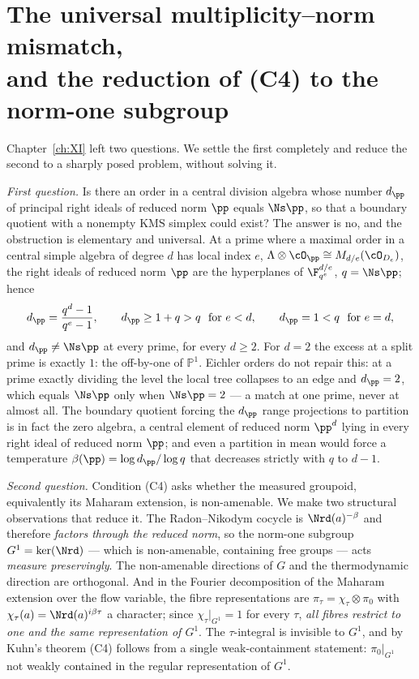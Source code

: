 \chapter[Multiplicity--norm mismatch and the reduction of (C4)]{The universal multiplicity--norm mismatch,\\ and the reduction of \textup{(C4)} to the norm-one subgroup}\label{ch:XII}
\begin{summary}
Chapter~\ref{ch:XI} left two questions. We settle the first completely and reduce the
second to a sharply posed problem, without solving it.

\emph{First question.} Is there an order in a central division algebra whose number
$d_\pp$ of principal right ideals of reduced norm $\pp$ equals $\Ns\pp$, so that a boundary
quotient with a nonempty $\mathrm{KMS}$ simplex could exist? The answer is no, and the
obstruction is elementary and universal. At a prime where a maximal order in a central
simple algebra of degree $d$ has local index $e$, $\Lambda\otimes\cO_\pp\cong M_{d/e}(\cO_{D_e})$,
the right ideals of reduced norm $\pp$ are the hyperplanes of $\F_{q^e}^{d/e}$, $q=\Ns\pp$;
hence
\[
d_\pp=\frac{q^d-1}{q^e-1},\qquad d_\pp\ge1+q>q\ \text{ for }e<d,\qquad d_\pp=1<q\ \text{ for }e=d,
\]
and $d_\pp\ne\Ns\pp$ at every prime, for every $d\ge2$. For $d=2$ the excess at a split prime
is exactly $1$: the off-by-one of $\mathbb P^1$. Eichler orders do not repair this: at a
prime exactly dividing the level the local tree collapses to an edge and $d_\pp=2$, which
equals $\Ns\pp$ only when $\Ns\pp=2$ --- a match at one prime, never at almost all. The
boundary quotient forcing the $d_\pp$ range projections to partition is in fact the zero
algebra, a central element of reduced norm $\pp^d$ lying in every right ideal of reduced norm
$\pp$; and even a partition in mean would force a temperature
$\beta(\pp)=\log d_\pp/\log q$ that decreases strictly with $q$ to $d-1$.

\emph{Second question.} Condition (C4) asks whether the measured groupoid, equivalently its
Maharam extension, is non-amenable. We make two structural observations that reduce it.
The Radon--Nikodym cocycle is $\Nrd(a)^{-\beta}$ and therefore \emph{factors through the
reduced norm}, so the norm-one subgroup $G^1=\ker(\Nrd)$ --- which is non-amenable,
containing free groups --- acts \emph{measure preservingly}. The non-amenable directions of
$G$ and the thermodynamic direction are orthogonal. And in the Fourier decomposition of the
Maharam extension over the flow variable, the fibre representations are
$\pi_\tau=\chi_\tau\otimes\pi_0$ with $\chi_\tau(a)=\Nrd(a)^{i\beta\tau}$ a character; since
$\chi_\tau|_{G^1}=1$ for every $\tau$, \emph{all fibres restrict to one and the same
representation of $G^1$}. The $\tau$-integral is invisible to $G^1$, and by Kuhn's theorem
(C4) follows from a single weak-containment statement: $\pi_0|_{G^1}$ not weakly contained in
the regular representation of $G^1$.


\end{summary}
